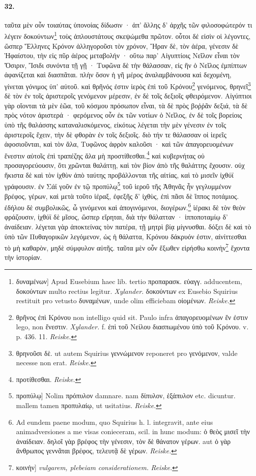 \documentclass[a4paper, 11pt, oneside, polutonikogreek, german]{article}
\begin{document}
\paragraph{32.}
ταῦτα μὲν οὖν τοιαύτας ὑπονοίας δίδωσιν · ἀπ' ἄλλης δ' ἀρχῆς τῶν φιλοσοφώτερόν τι λέγειν δοκούντων\footnote{δυναμένων] Apud Eusebium haec lib. tertio προπαρασκ. εὐαγγ. adducentem, δοκούντων multo rectius legitur. \emph{Xylander.} δοκούντων ex Eusebio Squirius restituit pro vetusto δυναμένων, unde olim efficiebam οἰομένων. \emph{Reiske.}} τοὺς ἁπλουστάτους σκεψώμεθα πρῶτον. οὗτοι δέ εἰσὶν οἱ λέγοντες, ὥσπερ Ἕλληνες Κρόνον ἀλληγοροῦσι τὸν χρόνον, Ἥραν δὲ, τὸν ἀέρα, γένεσιν δὲ Ἡφαίστου, τὴν εἰς πῦρ ἀέρος μεταβολήν · οὕτω παρ' Αἰγυπτίοις Νεῖλον εἶναι τὸν Ὄσιριν, Ἴσιδι συνόντα τῇ γῇ · Τυφῶνα δὲ τὴν θάλασσαν, εἰς ἣν ὁ Νεῖλος ἐμπίπτων ἀφανίζεται καὶ διασπᾶται. πλὴν ὅσον ἡ γῆ μέρος ἀναλαμβάνουσα καὶ δεχομένη, γίνεται γόνιμος ὑπ' αὐτοῦ. καὶ θρῆνός ἐστιν ἱερὸς ἐπὶ τοῦ Κρόνου\footnote{θρῆνος ἐπὶ Κρόνου non intelligo quid sit. Paulo infra ἀπαγορευομένων ἕν ἐστιν lego, non ἔνεστιν. \emph{Xylander.} f. ἐπὶ τοῦ Νείλου διασπωμένου ὑπὸ τοῦ Κρόνου. v. p. 436. 11. \emph{Reiske.}} γενόμενος, θρηνεῖ\footnote{θρηνοῦσι δὲ. ut autem Squirius γεννώμενον reponeret pro γενόμενον, valde necesse non erat. \emph{Reiske.}} δὲ τὸν ἐν τοῖς ἀριστεροῖς γενόμενον μέρεσιν, ἐν δὲ τοῖς δεξιοῖς φθειρόμενον. Αἰγύπτιοι γὰρ οἴονται τὰ μὲν ἑῶα, τοῦ κόσμου πρόσωπον εἶναι, τὰ δὲ πρὸς βοῤῥᾶν δεξιά, τὰ δὲ πρὸς νότον ἀριστερά · φερόμενος οὖν ἐκ τῶν νοτίων ὁ Νεῖλος, ἐν δὲ τοῖς βορείοις ὑπὸ τῆς θαλάσσης καταναλισκόμενος, εἰκότως λέγεται τὴν μὲν γένεσιν ἐν τοῖς ἀριστεροῖς ἔχειν, τὴν δὲ φθορὰν ἐν τοῖς δεξιοῖς. διὸ τήν τε θάλασσαν οἱ ἱερεῖς ἀφοσιοῦνται, καὶ τὸν ἅλα, Τυφῶνος ἀφρὸν καλοῦσι · καὶ τῶν ἀπαγορευομένων ἕνεστιν αὐτοῖς ἐπὶ τραπέζης ἅλα μὴ προστίθεσθαι.\footnote{προτίθεσθαι. \emph{Reiske.}} καὶ κυβερνήτας οὐ προσαγορεύουσιν, ὅτι χρῶνται θαλάττῃ, καὶ τὸν βίον ἀπὸ τῆς θαλάττης ἔχουσιν. οὐχ ἥκιστα δὲ καὶ τὸν ἰχθὺν ἀπὸ ταύτης προβάλλονται τῆς αἰτίας, καὶ τὸ μισεῖν ἰχθύϊ γράφουσιν. ἐν Σάϊ γοῦν ἐν τῷ προπύλῳ\footnote{προπύλῳ] Nolim πρόπυλον damnare. nam δίπυλον, ἑξάπυλον etc. dicuntur. mallem tamen προπυλαίῳ, ut usitatius. \emph{Reiske.}} τοῦ ἱεροῦ τῆς Ἀθηνᾶς ἦν γεγλυμμένον βρέφος, γέρων, καὶ μετὰ τοῦτο ἱέραξ, ἐφεξῆς δ' ἰχθὺς, ἐπὶ πᾶσι δὲ ἵππος ποτάμιος. ἐδήλου δὲ συμβολικῶς, ὦ γινόμενοι καὶ ἀπογινόμενοι, διογέρων.\footnote{Ad eundem paene modum, quo Squirius h. l. integravit, ante eius animadversiones a me visas conieceram, scil. in hunc modum: ὁ θεὸς μισεῖ τὴν ἀναίδειαν. δηλοῖ γὰρ βρέφος τὴν γένεσιν, τὸν δὲ θάνατον γέρων. aut ὁ γὰρ ἂνθρωπος γεννᾶται βρέφος, τελευτᾷ δὲ γέρων. \emph{Reiske.}} ἱέρακι δὲ τὸν θεὸν φράζουσιν, ἰχθύϊ δὲ μῖσος, ὥσπερ εἴρηται, διὰ τὴν θάλατταν · ἱπποποταμίῳ δ' ἀναίδειαν. λέγεται γὰρ ἀποκτείνας τὸν πατέρα, τῇ μητρὶ βίᾳ μίγνυσθαι. δόξει δὲ καὶ τὸ ὑπὸ τῶν Πυθαγορικῶν λεγόμενον, ὡς ἡ θάλαττα, Κρόνου δάκρυόν ἐστιν, αἰνίττεσθαι τὸ μὴ καθαρὸν, μηδὲ σύμφυλον αὐτῆς. ταῦτα μὲν οὖν ἔξωθεν εἰρήσθω κοινὴν\footnote{κοινὴν] \emph{vulgarem, plebeiam considerationem.} \emph{Reiske.}} ἔχοντα τὴν ἱστορίαν.
\end{document}
